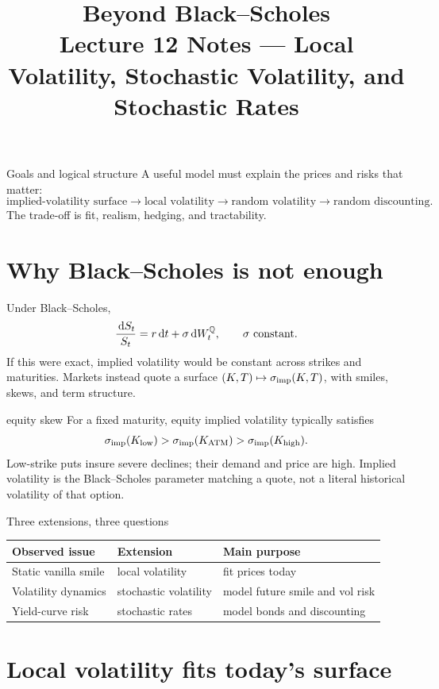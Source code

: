 \documentclass[10pt]{article}
\title{\textbf{Beyond Black--Scholes}\\\large Lecture 12 Notes --- Local Volatility, Stochastic Volatility, and Stochastic Rates}
\author{}\date{}
\newcommand{\dd}{\,\mathrm d}\newcommand{\Var}{\operatorname{Var}}
\theoremstyle{definition}\newtheorem{definition}{Definition}[section]
\begin{document}
\maketitle\vspace{-1.4em}
\begin{keyidea}{Goals and logical structure}
A useful model must explain the prices and risks that matter:
\[
\text{implied-volatility surface}\longrightarrow\text{local volatility}
\longrightarrow\text{random volatility}\longrightarrow\text{random discounting}.
\]
The trade-off is fit, realism, hedging, and tractability.
\end{keyidea}

\section{Why Black--Scholes is not enough}
Under Black--Scholes,
\[
\frac{\dd S_t}{S_t}=r\dd t+\sigma\dd W_t^\Q,
\qquad\sigma\text{ constant}.
\]
If this were exact, implied volatility would be constant across strikes and
maturities. Markets instead quote a surface
\((K,T)\mapsto\sigma_{\rm imp}(K,T)\), with smiles, skews, and term
structure.
\begin{boardexample}{equity skew}
For a fixed maturity, equity implied volatility typically satisfies
\[
\sigma_{\rm imp}(K_{\rm low})>
\sigma_{\rm imp}(K_{\rm ATM})>
\sigma_{\rm imp}(K_{\rm high}).
\]
Low-strike puts insure severe declines; their demand and price are high.
Implied volatility is the Black--Scholes parameter matching a quote, not a
literal historical volatility of that option.
\end{boardexample}
\begin{keyidea}{Three extensions, three questions}
\begin{center}
\begin{tabular}{p{}|p{}|p{}}
\toprule
Observed issue & Extension & Main purpose\\\midrule
Static vanilla smile & local volatility & fit prices today\\
Volatility dynamics & stochastic volatility & model future smile and vol risk\\
Yield-curve risk & stochastic rates & model bonds and discounting\\
\bottomrule
\end{tabular}
\end{center}
\end{keyidea}

\section{Local volatility fits today's surface}
\end{document}
